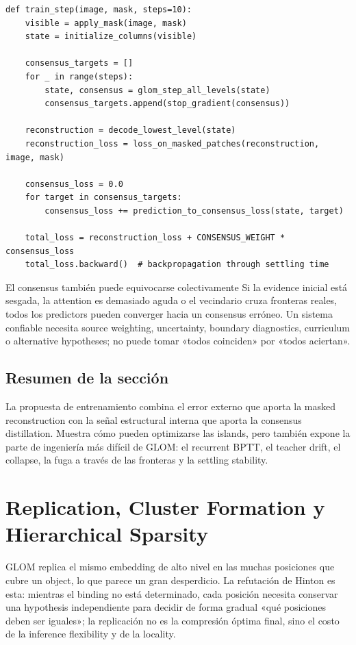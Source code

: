 \documentclass[a4paper]{article}
\begin{document}
\begin{lstlisting}[caption={Pseudocódigo didáctico de masked reconstruction y consensus training}]
def train_step(image, mask, steps=10):
    visible = apply_mask(image, mask)
    state = initialize_columns(visible)

    consensus_targets = []
    for _ in range(steps):
        state, consensus = glom_step_all_levels(state)
        consensus_targets.append(stop_gradient(consensus))

    reconstruction = decode_lowest_level(state)
    reconstruction_loss = loss_on_masked_patches(reconstruction, image, mask)

    consensus_loss = 0.0
    for target in consensus_targets:
        consensus_loss += prediction_to_consensus_loss(state, target)

    total_loss = reconstruction_loss + CONSENSUS_WEIGHT * consensus_loss
    total_loss.backward()  # backpropagation through settling time
\end{lstlisting}

\begin{warningbox}{El consensus también puede equivocarse colectivamente}
Si la evidence inicial está sesgada, la attention es demasiado aguda o el vecindario cruza fronteras reales, todos los predictors pueden converger hacia un consensus erróneo. Un sistema confiable necesita source weighting, uncertainty, boundary diagnostics, curriculum o alternative hypotheses; no puede tomar «todos coinciden» por «todos aciertan».
\end{warningbox}

\subsection{Resumen de la sección}

La propuesta de entrenamiento combina el error externo que aporta la masked reconstruction con la señal estructural interna que aporta la consensus distillation. Muestra cómo pueden optimizarse las islands, pero también expone la parte de ingeniería más difícil de GLOM: el recurrent BPTT, el teacher drift, el collapse, la fuga a través de las fronteras y la settling stability.
\section{Replication, Cluster Formation y Hierarchical Sparsity}

GLOM replica el mismo embedding de alto nivel en las muchas posiciones que cubre un object, lo que parece un gran desperdicio. La refutación de Hinton es esta: mientras el binding no está determinado, cada posición necesita conservar una hypothesis independiente para decidir de forma gradual «qué posiciones deben ser iguales»; la replicación no es la compresión óptima final, sino el costo de la inference flexibility y de la locality.
\end{document}
